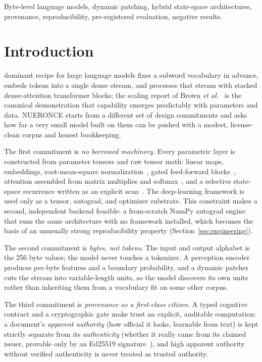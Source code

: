 \documentclass[journal]{IEEEtran}
\begin{document}
\begin{IEEEkeywords}
Byte-level language models, dynamic patching, hybrid state-space architectures, provenance, reproducibility, pre-registered evaluation, negative results.
\end{IEEEkeywords}

\section{Introduction}
 dominant recipe for large language models fixes a subword vocabulary in advance, embeds tokens into a single dense stream, and processes that stream with stacked dense-attention transformer blocks; the scaling report of Brown \emph{et al.}~\cite{Brown2020} is the canonical demonstration that capability emerges predictably with parameters and data. NUERONCE starts from a different set of design commitments and asks how far a very small model built on them can be pushed with a modest, license-clean corpus and honest bookkeeping.

The first commitment is \emph{no borrowed machinery}. Every parametric layer is constructed from parameter tensors and raw tensor math: linear maps, embeddings, root-mean-square normalization~\cite{Zhang2019}, gated feed-forward blocks~\cite{Shazeer2020}, attention assembled from matrix multiplies and softmax~\cite{Vaswani2017}, and a selective state-space recurrence written as an explicit scan~\cite{Gu2023}. The deep-learning framework is used only as a tensor, autograd, and optimizer substrate. This constraint makes a second, independent backend feasible: a from-scratch NumPy autograd engine that runs the same architecture with no framework installed, which becomes the basis of an unusually strong reproducibility property (Section~\ref{sec:engineering}).

The second commitment is \emph{bytes, not tokens}. The input and output alphabet is the 256 byte values; the model never touches a tokenizer. A perception encoder produces per-byte features and a boundary probability, and a dynamic patcher cuts the stream into variable-length units, so the model discovers its own units rather than inheriting them from a vocabulary fit on some other corpus.

The third commitment is \emph{provenance as a first-class citizen}. A typed cognitive contract and a cryptographic gate make trust an explicit, auditable computation: a document's \emph{apparent authority} (how official it looks, learnable from text) is kept strictly separate from its \emph{authenticity} (whether it really came from its claimed issuer, provable only by an Ed25519 signature~\cite{Bernstein2012}), and high apparent authority without verified authenticity is never treated as trusted authority.
\end{document}
